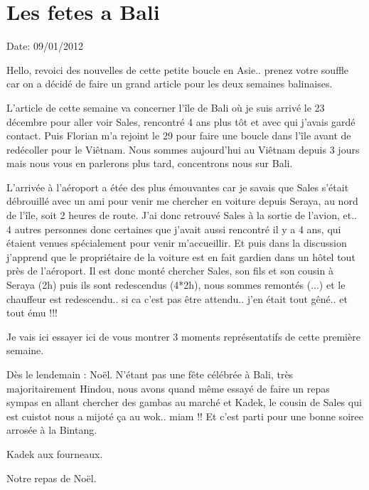 \section{Les fetes a Bali}

Date: 09/01/2012

\begin{multicols}{2}

Hello, revoici des nouvelles de cette petite boucle en Asie.. prenez votre souffle car on a décidé de faire un grand article pour les deux semaines balinaises.

L'article de cette semaine va concerner l'île de Bali où je suis arrivé le 23 décembre pour aller voir Sales, rencontré 4 ans plus tôt et avec qui j'avais gardé contact. Puis Florian m'a rejoint le 29 pour faire une boucle dans l'île avant de redécoller pour le Viêtnam. Nous sommes aujourd'hui au Viêtnam depuis 3 jours mais nous vous en parlerons plus tard, concentrons nous sur Bali.

L'arrivée à l'aéroport a étée des plus émouvantes car je savais que Sales s'était débrouillé avec un ami pour venir me chercher en voiture depuis Seraya, au nord de l'île, soit 2 heures de route. J'ai donc retrouvé Sales à la sortie de l'avion, et.. 4 autres personnes donc certaines que j'avait aussi rencontré il y a 4 ans, qui étaient venues spécialement pour venir m'accueillir. Et puis dans la discussion j'apprend que le propriétaire de la voiture est en fait gardien dans un hôtel tout près de l'aéroport. Il est donc monté chercher Sales, son fils et son cousin à Seraya (2h) puis ils sont redescendus (4*2h), nous sommes remontés (...) et le chauffeur est redescendu.. si ca c'est pas être attendu.. j'en était tout gêné.. et tout ému !!!

Je vais ici essayer ici de vous montrer 3 moments représentatifs de cette première semaine.

Dès le lendemain : Noël. N'étant pas une fête célébrée à Bali, très majoritairement Hindou, nous avons quand même essayé de faire un repas sympas en allant chercher des gambas au marché et Kadek, le cousin de Sales qui est cuistot nous a mijoté ça au wok.. miam !! Et c'est parti pour une bonne soiree arrosée à la Bintang.

Kadek aux fourneaux.


Notre repas de Noël.


\end{multicols}
